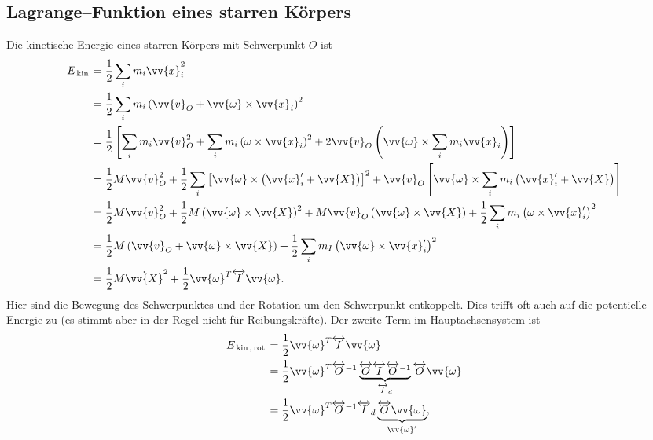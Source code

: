 \documentclass[a4paper,12pt]{article}
\numberwithin{equation}{section}
\begin{document}
\subsection{Lagrange--Funktion eines starren Körpers}
Die kinetische Energie eines starren Körpers mit Schwerpunkt $O$ ist
\begin{align*}
        E_{\,\text{kin}\,}&=\dfrac{1}{2}\sum_{i}^{}m_i\dot{\vv{x}}_i^2\\
                          &=\dfrac{1}{2}\sum_{i}^{}m_i\left(\vv{v}_O +\vv{\omega }\times \vv{x}_i\right)^2\\
                          &=\dfrac{1}{2}\left[\sum_{i}^{}m_i\vv{v}_O^2+\sum_{i}^{}m_i\left(\omega \times \vv{x}_i\right)^2+2\vv{v}_O\left(\vv{\omega }\times \sum_{i}^{}m_i\vv{x}_i\right)\right]\\
                          &=\dfrac{1}{2}M\vv{v}_O^2+\dfrac{1}{2}\sum_{i}^{}\left[\vv{\omega }\times \left(\vv{x}_i'+\vv{X}\right)\right]^2+\vv{v}_O\left[\vv{\omega }\times \sum_{i}^{}m_i\left(\vv{x}_i'+\vv{X}\right)\right]\\
                          &=\dfrac{1}{2}M\vv{v}_O^2+\dfrac{1}{2}M\left(\vv{\omega }\times \vv{X}\right)^2+M\vv{v}_O\left(\vv{\omega }\times \vv{X}\right)+\dfrac{1}{2}\sum_{i}^{}m_i\left(\omega \times \vv{x}_i'\right)^2\\
                          &=\dfrac{1}{2}M\left(\vv{v}_O +\vv{\omega }\times \vv{X}\right)+\dfrac{1}{2}\sum_{i}^{}m_I\left(\vv{\omega }\times \vv{x}_i'\right)^2\\
                          &=\dfrac{1}{2}M\dot{\vv{X}}^2+\dfrac{1}{2}\vv{\omega }^T\overleftrightarrow{I}\vv{\omega }
.\end{align*}
Hier sind die Bewegung des Schwerpunktes und der Rotation um den Schwerpunkt entkoppelt. Dies trifft oft auch auf die potentielle Energie zu (es stimmt aber in der Regel nicht für Reibungskräfte). Der zweite Term im Hauptachsensystem ist
\begin{align*}
        E_{\,\text{kin}\,,\,\text{rot}\,}&=\dfrac{1}{2}\vv{\omega }^T\overleftrightarrow{I}\vv{\omega }\\
                                         &=\dfrac{1}{2}\vv{\omega }^T\overleftrightarrow{O}^{-1}\underbrace{\overleftrightarrow{O}\overleftrightarrow{I}\overleftrightarrow{O}^{-1}}_{\overleftrightarrow{I}_d}\overleftrightarrow{O}\vv{\omega }\\
                                         &=\dfrac{1}{2}\vv{\omega }^T\overleftrightarrow{O}^{-1}\overleftrightarrow{I}_d\underbrace{\overleftrightarrow{O}\vv{\omega }}_{\vv{\omega }'}
,\end{align*}
\end{document}
